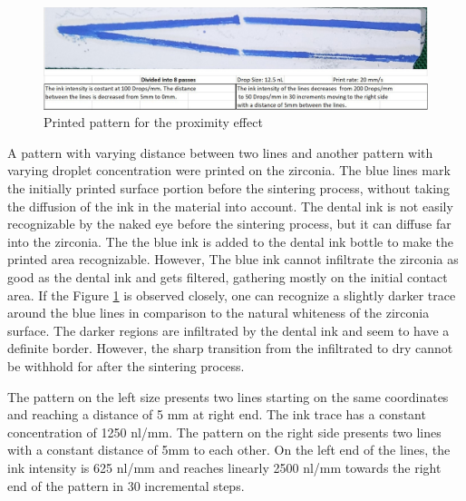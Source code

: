 \bigskip

\begin{figure}[H]
	\centering
	\includegraphics[width=1\textwidth]{grafiken/proximityprint.jpg}
	\caption{Printed pattern for the proximity effect}
	\label{fig:proximityprint}
\end{figure} 

\bigskip

A pattern with varying distance between two lines and another pattern with varying droplet concentration were printed on the zirconia. The blue lines mark the initially printed surface portion before the sintering process, without taking the diffusion of the ink in the material into account. The dental ink is not easily recognizable by the naked eye before the sintering process, but it can diffuse far into the zirconia. The the blue ink is added to the dental ink bottle to make the printed area recognizable. However, The blue ink cannot infiltrate the zirconia as good as the dental ink and gets filtered, gathering mostly on the initial contact area. If the Figure \ref{fig:proximityprint} is observed closely, one can recognize a slightly darker trace around the blue lines in comparison to the natural whiteness of the zirconia surface. The darker regions are infiltrated by the dental ink and seem to have a definite border. However, the sharp transition from the infiltrated to dry cannot be withhold for after the sintering process.

The pattern on the left size presents two lines starting on the same coordinates and reaching a distance of 5 mm at right end. The ink trace has a constant concentration of 1250 nl/mm. The pattern on the right side presents two lines with a constant distance of 5mm to each other. On the left end of the lines, the ink intensity is 625 nl/mm and reaches linearly 2500 nl/mm towards the right end of the pattern in 30 incremental steps.

\bigskip

